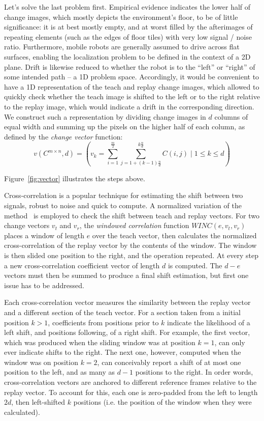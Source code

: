 \documentclass[twocolumn, 9pt,fleqn]{jsproceedings}
\begin{document}
Let's solve the last problem first. Empirical evidence indicates the lower half of change images, which mostly depicts the environment's floor, to be of little significance: it is at best mostly empty, and at worst filled by the afterimages of repeating elements (such as the edges of floor tiles) with very low signal / noise ratio. Furthermore, mobile robots are generally assumed to drive across flat surfaces, enabling the localization problem to be defined in the context of a 2D plane. Drift is likewise reduced to whether the robot is to the ``left'' or ``right'' of some intended path -- a 1D problem space. Accordingly, it would be convenient to have a 1D representation of the teach and replay change images, which allowed to quickly check whether the teach image is shifted to the left or to the right relative to the replay image, which would indicate a drift in the corresponding direction. We construct such a representation by dividing change images in $d$ columns of equal width and summing up the pixels on the higher half of each column, as defined by the \textit{change vector} function:
\begin{equation}
v(C^{m \times n}, d) = (v_k = \sum_{i=1}^{\frac{m}{2}} {\sum_{j=1 + (k - 1)\frac{n}{d}}^{k\frac{n}{d}}{C(i, j)}} \; | \; 1 \leq k \leq d)
\end{equation}

Figure~\ref{fig:vector} illustrates the steps above.

Cross-correlation is a popular technique for estimating the shift between two signals, robust to noise and quick to compute. A normalized variation of the method~\cite{HEL14b} is employed to check the shift between teach and replay vectors. For two change vectors $v_t$ and $v_r$, the \textit{windowed correlation} function $WINC(e, v_t, v_r)$ places a window of length $e$ over the teach vector, then calculates the normalized cross-correlation of the replay vector by the contents of the window. The window is then slided one position to the right, and the operation repeated. At every step a new cross-correlation coefficient vector of length $d$ is computed. The $d - e$ vectors must then be summed to produce a final shift estimation, but first one issue has to be addressed.

Each cross-correlation vector measures the similarity between the replay vector and a different section of the teach vector. For a section taken from a initial position $k > 1$, coefficients from positions prior to $k$ indicate the likelihood of a left shift, and positions following, of a right shift. For example, the first vector, which was produced when the sliding window was at position $k = 1$, can only ever indicate shifts to the right. The next one, however, computed when the window was on position $k = 2$, can conceivably report a shift of at most one position to the left, and as many as $d-1$ positions to the right. In order words, cross-correlation vectors are anchored to different reference frames relative to the replay vector. To account for this, each one is zero-padded from the left to length $2d$, then left-shifted $k$ positions (i.e. the position of the window when they were calculated).
\end{document}
